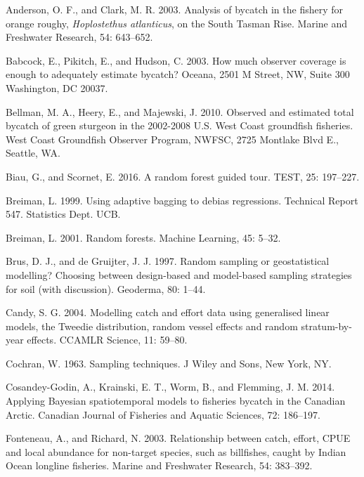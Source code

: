 \documentclass[]{article}
\begin{document}
\leavevmode\hypertarget{ref-anderson2003}{}%
Anderson, O. F., and Clark, M. R. 2003. Analysis of bycatch in the
fishery for orange roughy, \emph{Hoplostethus atlanticus}, on the South
Tasman Rise. Marine and Freshwater Research, 54: 643--652.

\leavevmode\hypertarget{ref-babcock2003}{}%
Babcock, E., Pikitch, E., and Hudson, C. 2003. How much observer
coverage is enough to adequately estimate bycatch? Oceana, 2501 M
Street, NW, Suite 300 Washington, DC 20037.

\leavevmode\hypertarget{ref-bellman2010}{}%
Bellman, M. A., Heery, E., and Majewski, J. 2010. Observed and estimated
total bycatch of green sturgeon in the 2002-2008 U.S. West Coast
groundfish fisheries. West Coast Groundfish Observer Program, NWFSC,
2725 Montlake Blvd E., Seattle, WA.

\leavevmode\hypertarget{ref-biau2016}{}%
Biau, G., and Scornet, E. 2016. A random forest guided tour. TEST, 25:
197--227.

\leavevmode\hypertarget{ref-breiman1999}{}%
Breiman, L. 1999. Using adaptive bagging to debias regressions.
Technical Report 547. Statistics Dept. UCB.

\leavevmode\hypertarget{ref-breiman2001}{}%
Breiman, L. 2001. Random forests. Machine Learning, 45: 5--32.

\leavevmode\hypertarget{ref-brus1997}{}%
Brus, D. J., and de Gruijter, J. J. 1997. Random sampling or
geostatistical modelling? Choosing between design-based and model-based
sampling strategies for soil (with discussion). Geoderma, 80: 1--44.

\leavevmode\hypertarget{ref-candy2004}{}%
Candy, S. G. 2004. Modelling catch and effort data using generalised
linear models, the Tweedie distribution, random vessel effects and
random stratum-by-year effects. CCAMLR Science, 11: 59--80.

\leavevmode\hypertarget{ref-cochran1963}{}%
Cochran, W. 1963. Sampling techniques. J Wiley and Sons, New York, NY.

\leavevmode\hypertarget{ref-cosandey-godin2014}{}%
Cosandey-Godin, A., Krainski, E. T., Worm, B., and Flemming, J. M. 2014.
Applying Bayesian spatiotemporal models to fisheries bycatch in the
Canadian Arctic. Canadian Journal of Fisheries and Aquatic Sciences, 72:
186--197.

\leavevmode\hypertarget{ref-fonteneau2003}{}%
Fonteneau, A., and Richard, N. 2003. Relationship between catch, effort,
CPUE and local abundance for non-target species, such as billfishes,
caught by Indian Ocean longline fisheries. Marine and Freshwater
Research, 54: 383--392.
\end{document}
